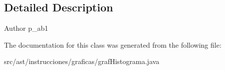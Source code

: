 \subsection{Detailed Description}
\begin{DoxyAuthor}{Author}
p\+\_\+ab1 
\end{DoxyAuthor}


The documentation for this class was generated from the following file\+:\begin{DoxyCompactItemize}
\item 
src/ast/instrucciones/graficas/graf\+Histograma.\+java\end{DoxyCompactItemize}
